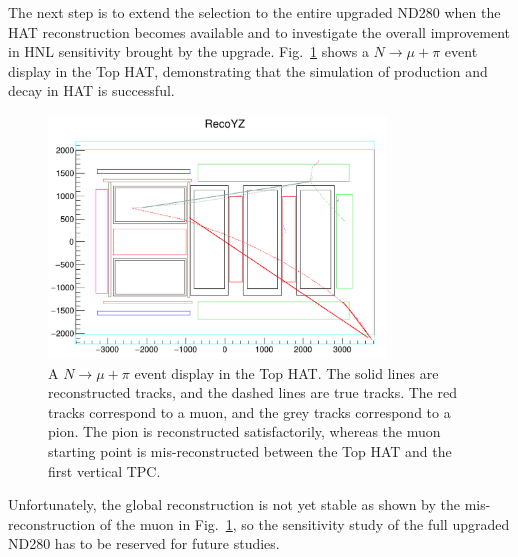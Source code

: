         The next step is to extend the selection to the entire upgraded ND280 when the HAT reconstruction becomes available and to investigate the overall improvement in HNL sensitivity brought by the upgrade.
        Fig.~\ref{fig:hnl-hatevedis} shows a $N\rightarrow\mu+\pi$ event display in the Top HAT, demonstrating that the simulation of production and decay in HAT is successful. 
        \begin{figure}[!htb] 
            \centering 		
            \includegraphics[width=0.8\textwidth]{figures/hnl/HATevedis.png}
            \caption{\label{fig:hnl-hatevedis} A $N\rightarrow\mu+\pi$ event display in the Top HAT.
            The solid lines are reconstructed tracks, and the dashed lines are true tracks.
            The red tracks correspond to a muon, and the grey tracks correspond to a pion.
            The pion is reconstructed satisfactorily, whereas the muon starting point is mis-reconstructed between the Top HAT and the first vertical TPC.
            }
        \end{figure}
        Unfortunately, the global reconstruction is not yet stable as shown by the mis-reconstruction of the muon in Fig.~\ref{fig:hnl-hatevedis}, so the sensitivity study of the full upgraded ND280 has to be reserved for future studies.

